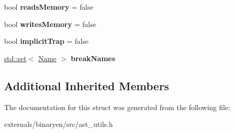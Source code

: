\begin{DoxyCompactItemize}
bool {\bfseries reads\+Memory} = false
\item 
\mbox{\label{structwasm_1_1_effect_analyzer_a58af7165e0f6f58dd2843f45d7b53808}} 
bool {\bfseries writes\+Memory} = false
\item 
\mbox{\label{structwasm_1_1_effect_analyzer_afb6c353f54c929d7a1d7737b05d2c7e6}} 
bool {\bfseries implicit\+Trap} = false
\item 
\mbox{\label{structwasm_1_1_effect_analyzer_a9b1b3f45ef69149f2cb6a0769ee7b79f}} 
\mbox{\hyperlink{classstd_1_1set}{std\+::set}}$<$ \mbox{\hyperlink{structwasm_1_1_name}{Name}} $>$ {\bfseries break\+Names}
\end{DoxyCompactItemize}
\subsection*{Additional Inherited Members}


The documentation for this struct was generated from the following file\+:\begin{DoxyCompactItemize}
\item 
externals/binaryen/src/ast\+\_\+utils.\+h\end{DoxyCompactItemize}
